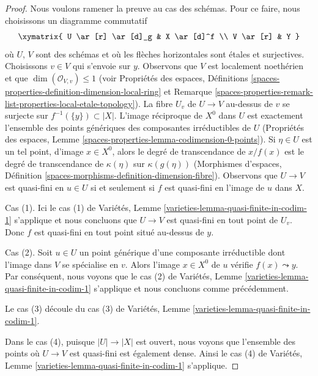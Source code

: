 \begin{proof}
Nous voulons ramener la preuve au cas des schémas. Pour ce faire, nous
choisissons un diagramme commutatif
$$
\xymatrix{
U \ar[r] \ar[d]_g & X \ar[d]^f \\
V \ar[r] & Y
}
$$
où $U$, $V$ sont des schémas et où les flèches horizontales sont \'etales
et surjectives. Choisissons $v \in V$ qui s'envoie sur $y$. Observons que
$V$ est localement noethérien et que $\dim(\mathcal{O}_{V, v}) \leq 1$
(voir Propriétés des espaces, Définitions
\ref{spaces-properties-definition-dimension-local-ring} et
Remarque \ref{spaces-properties-remark-list-properties-local-etale-topology}).
La fibre $U_v$ de $U \to V$ au-dessus de $v$ se surjecte sur
$f^{-1}(\{y\}) \subset |X|$. L'image réciproque de $X^0$ dans $U$
est exactement l'ensemble des
points génériques des composantes irréductibles de $U$ (Propriétés des espaces, Lemme
\ref{spaces-properties-lemma-codimension-0-points}).
Si $\eta \in U$ est un tel point, d'image $x \in X^0$, alors
le degré de transcendance de $x / f(x)$ est le degré de transcendance de
$\kappa(\eta)$ sur $\kappa(g(\eta))$
(Morphismes d'espaces, Définition
\ref{spaces-morphisms-definition-dimension-fibre}).
Observons que $U \to V$ est quasi-fini en $u \in U$ si et seulement si
$f$ est quasi-fini en l'image de $u$ dans $X$.

\medskip\noindent
Cas (1). Ici le cas (1) de
Variétés, Lemme \ref{varieties-lemma-quasi-finite-in-codim-1} s'applique
et nous concluons que $U \to V$ est quasi-fini en tout point de $U_v$.
Donc $f$ est quasi-fini en tout point situé au-dessus de $y$.

\medskip\noindent
Cas (2). Soit $u \in U$ un point générique d'une composante irréductible
dont l'image dans $V$ se spécialise en $v$. Alors l'image $x \in X^0$ de
$u$ vérifie $f(x) \leadsto y$. Par conséquent, nous voyons que
le cas (2) de
Variétés, Lemme \ref{varieties-lemma-quasi-finite-in-codim-1} s'applique
et nous concluons comme précédemment.

\medskip\noindent
Le cas (3) découle du cas (3) de
Variétés, Lemme \ref{varieties-lemma-quasi-finite-in-codim-1}.

\medskip\noindent
Dans le cas (4), puisque $|U| \to |X|$ est ouvert, nous voyons que
l'ensemble des points où $U \to V$ est quasi-fini est également dense.
Ainsi le cas (4) de
Variétés, Lemme \ref{varieties-lemma-quasi-finite-in-codim-1} s'applique.
\end{proof}

